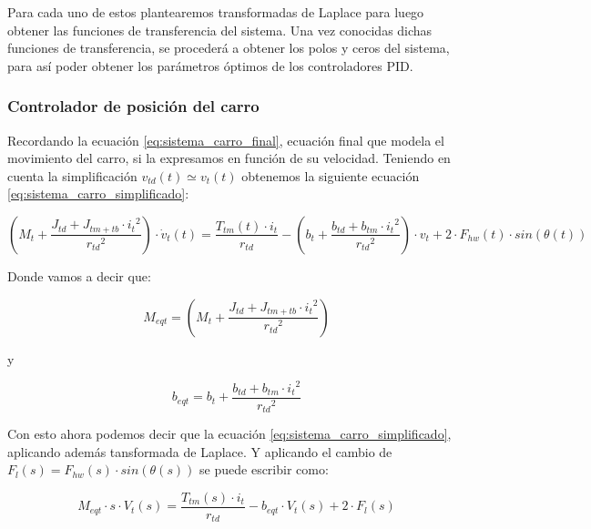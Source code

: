 \documentclass[11pt]{article}
\begin{document}
Para cada uno de estos plantearemos transformadas de Laplace para luego obtener las funciones de transferencia del sistema. Una vez conocidas dichas funciones de transferencia, se procederá a obtener los polos y ceros del sistema, para así poder obtener los parámetros óptimos de los controladores PID.

\newpage

\subsubsection{Controlador de posición del carro}
Recordando la ecuación \ref{eq:sistema_carro_final}, ecuación final que modela el movimiento del carro, si la expresamos en función de su velocidad. Teniendo en cuenta la simplificación $v_{td}(t)\simeq v_{t}(t)$ obtenemos la siguiente ecuación \ref{eq:sistema_carro_simplificado}:

\begin{equation}
	\label{eq:sistema_carro_simplificado}
	\left ( M_{t}+ \frac{J_{td}+J_{tm+tb}\cdot{i_{t}}^{2}}{{r_{td}}^{2}} \right )\cdot\dot{v}_{t}(t)=\frac{T_{tm}(t)\cdot i_{t}}{r_{td}}-\left (b_{t} +\frac{b_{td}+b_{tm}\cdot{i_{t}}^{2}}{{r_{td}}^{2}} \right )\cdot v_{t} + 2\cdot F_{hw}(t) \cdot sin \left ( \theta(t) \right )
\end{equation}

Donde vamos a decir que:

\begin{equation}
	\label{eq:sistema_carro_masa_equivalente}
	M_{eqt} = \left ( M_{t}+ \frac{J_{td}+J_{tm+tb}\cdot{i_{t}}^{2}}{{r_{td}}^{2}} \right )
\end{equation}

y

\begin{equation}
	\label{eq:sistema_carro_friccion_equivalente}
	b_{eqt} = b_{t} +\frac{b_{td}+b_{tm}\cdot{i_{t}}^{2}}{{r_{td}}^{2}}
\end{equation}

Con esto ahora podemos decir que la ecuación \ref{eq:sistema_carro_simplificado}, aplicando además tansformada de Laplace. Y aplicando el cambio de $F_{l}(s)=F_{hw}(s) \cdot sin \left ( \theta(s) \right )$ se puede escribir como:

\begin{equation}
	\label{eq:sistema_carro_simplificado_laplace}
	M_{eqt}\cdot s\cdot V_{t}(s) = \frac{T_{tm}(s)\cdot i_{t}}{r_{td}}-b_{eqt}\cdot V_{t}(s) + 2\cdot F_{l}(s)
\end{equation}
\end{document}
